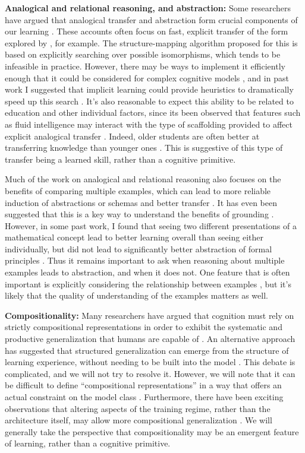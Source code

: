 \textbf{Analogical and relational reasoning, and abstraction:} Some researchers have argued that analogical transfer and abstraction form crucial components of our learning \citep[e.g.][]{Gentner2003, Lakoff1980, Gentner2017}. These accounts often focus on fast, explicit transfer of the form explored by \citet{Gick1980}, for example. The structure-mapping algorithm \citep{Falkenhainer1989} proposed for this is based on explicitly searching over possible isomorphisms, which tends to be infeasible in practice. However, there may be ways to implement it efficiently enough that it could be considered for complex cognitive models \citep{Forbus2017}, and in past work I suggested that implicit learning could provide heuristics to dramatically speed up this search \citep{Lampinen2017a}. It's also reasonable to expect this ability to be related to education and other individual factors, since its been observed that features such as fluid intelligence may interact with the type of scaffolding provided to affect explicit analogical transfer \citep{Kubricht2017}. Indeed, older students are often better at transferring knowledge than younger ones \citep[e.g.][]{Chen1999}. This is suggestive of this type of transfer being a learned skill, rather than a cognitive primitive. \par
Much of the work on analogical and relational reasoning also focuses on the benefits of comparing multiple examples, which can lead to more reliable induction of abstractions or schemas and better transfer \citep{Gick1980, Gentner2017}. It has even been suggested that this is a key way to understand the benefits of grounding \citep{Jamrozik2016}. However, in some past work, I found that seeing two different presentations of a mathematical concept lead to better learning overall than seeing either individually, but did not lead to significantly better abstraction of formal principles \citep{Lampinen2017b}. Thus it remains important to ask when reasoning about multiple examples leads to abstraction, and when it does not. One feature that is often important is explicitly considering the relationship between examples \citep{Gentner2017}, but it's likely that the quality of understanding of the examples matters as well. \par 
\textbf{Compositionality:} Many researchers have argued that cognition must rely on strictly compositional representations in order to exhibit the systematic and productive generalization that humans are capable of \citep[e.g.][]{Fodor2001, Fodor2008lot2, Lake2017}. An alternative approach has suggested that structured generalization can emerge from the structure of learning experience, without needing to be built into the model \citep{McClelland2010, Hansen2017}. This debate is complicated, and we will not try to resolve it. However, we will note that it can be difficult to define ``compositional representations'' in a way that offers an actual constraint on the model class \citep[c.f.][]{Zadrozny1992}. Furthermore, there have been exciting observations that altering aspects of the training regime, rather than the architecture itself, may allow more compositional generalization \citep{Hill2019a}. We will generally take the perspective that compositionality may be an emergent feature of learning, rather than a cognitive primitive. \par
